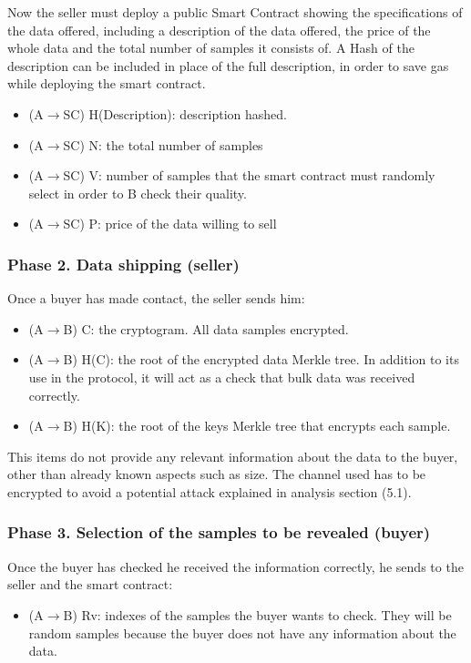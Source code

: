 \documentclass[]{article}
\begin{document}
Now the seller must deploy a public Smart Contract showing the specifications of the data offered, including a description of the data offered, the price of the whole data and the total number of samples it consists of.
A Hash of the description can be included in place of the full description, in order to save gas while deploying the smart contract.

\begin{itemize}
\item (A$\rightarrow$SC) H(Description): description hashed.
\item (A$\rightarrow$SC) N: the total number of samples
\item (A$\rightarrow$SC) V: number of samples that the smart contract must randomly select in order to B check their quality.
\item (A$\rightarrow$SC) P: price of the data willing to sell
\end{itemize}

\subsubsection{Phase 2. Data shipping (seller)}
Once a buyer has made contact, the seller sends him:
\begin{itemize}
\item (A$\rightarrow$B) C: the cryptogram. All data samples encrypted.
\item (A$\rightarrow$B) H(C): the root of the encrypted data Merkle tree. In addition to its use in the protocol, it will act as a check that bulk data was received correctly.
\item (A$\rightarrow$B) H(K): the root of the keys Merkle tree that encrypts each sample.
\end{itemize}
This items do not provide any relevant information about the data to the buyer, other than already known aspects such as size. The channel used has to be encrypted to avoid a potential attack explained in analysis section (5.1). 

\subsubsection{Phase 3. Selection of the samples to be revealed (buyer)}
Once the buyer has checked he received the information correctly, he sends to the seller and the smart contract:
\begin{itemize}
\item (A$\rightarrow$B) Rv: indexes of the samples the buyer wants to check.
They will be random samples because the buyer does not have any information about the data.
\end{itemize}
\end{document}
